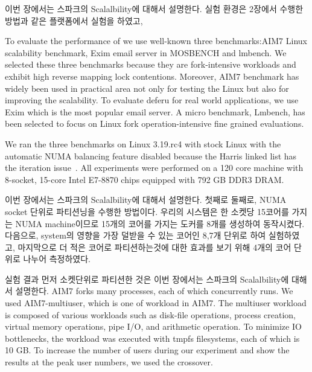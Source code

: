 \ifkor
이번 장에서는 스파크의 Scalalbility에 대해서 설명한다. 실험 환경은 2장에서 수행한 방법과
같은 플랫폼에서 실험을 하였고, 

To evaluate the performance of we use well-known
three benchmarks:AIM7 Linux scalability benchmark, Exim email server in
MOSBENCH and lmbench.
We selected these three benchmarks because they are fork-intensive workloads and
exhibit high reverse mapping lock contentions.
Moreover, AIM7 benchmark has widely been used in practical area not only for testing the
Linux but also for improving the scalability. 
To evaluate deferu for real world
applications, we use Exim which is the most popular email server.
A micro benchmark, Lmbench, has been selected to focus on Linux fork operation-intensive
fine grained evaluations.

We ran the three benchmarks on Linux 3.19.rc4 with stock Linux with 
the automatic NUMA balancing feature disabled because the
Harris linked list has the iteration issue~\cite{petrank2013lock}. 
All experiments were performed on a 120 core machine with 8-socket, 15-core
Intel E7-8870 chips equipped with 792 GB DDR3 DRAM.
\else

\fi




\ifkor
이번 장에서는 스파크의 Scalalbility에 대해서 설명한다. 첫째로 
둘째로, NUMA socket 단위로 파티션닝을 수행한 방법이다. 우리의 시스템은 한 소켓당 15코어를
가지는 NUMA machine이므로 15개의 코어를 가지는 도커를 8개를 생성하여 동작시켰다.
다음으로, system의 영향을 가장 덜받을 수 있는 코어인 8,7개 단위로 하여 실험하였고, 
마지막으로 더 적은 코어로 파티션하는것에 대한 효과를 보기 위해 4개의 코어 단위로 나누어 측정하였다. 
\else

\fi




\ifkor
실험 결과 먼저 소켓단위로 파티션한 것은 
이번 장에서는 스파크의 Scalalbility에 대해서 설명한다.
AIM7 forks many processes, each of which concurrently runs. 
We used AIM7-multiuser, which is one of workload in AIM7.
The multiuser workload is composed of various workloads such as disk-file
operations, process creation, virtual memory operations, pipe I/O, and
arithmetic operation.
To minimize IO bottlenecks, the workload was executed with tmpfs filesystems, each
of which is 10 GB.
To increase the number of users during our experiment and show the results at the
peak user numbers, 
we used the crossover.

